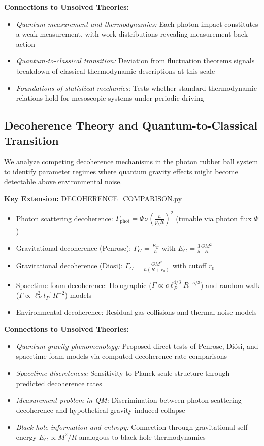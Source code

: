\documentclass[12pt,twoside]{article}
\begin{document}
\textbf{Connections to Unsolved Theories:}
\begin{itemize}
\item \textit{Quantum measurement and thermodynamics:} Each photon impact constitutes a weak measurement, with work distributions revealing measurement back-action
\item \textit{Quantum-to-classical transition:} Deviation from fluctuation theorems signals breakdown of classical thermodynamic descriptions at this scale
\item \textit{Foundations of statistical mechanics:} Tests whether standard thermodynamic relations hold for mesoscopic systems under periodic driving
\end{itemize}

\subsection{Decoherence Theory and Quantum-to-Classical Transition}
We analyze competing decoherence mechanisms in the photon rubber ball system to identify parameter regimes where quantum gravity effects might become detectable above environmental noise.

\textbf{Key Extension:} DECOHERENCE\_COMPARISON.py
\begin{itemize}
\item Photon scattering decoherence: $\Gamma_{\text{phot}} = \Phi \sigma \left(\frac{\hbar}{p_\lambda R}\right)^2$ (tunable via photon flux $\Phi$)
\item Gravitational decoherence (Penrose): $\Gamma_G = \frac{E_G}{\hbar}$ with $E_G = \frac{3}{5}\frac{GM^2}{R}$
\item Gravitational decoherence (Diosi): $\Gamma_G = \frac{G M^2}{\hbar(R + r_0)}$ with cutoff $r_0$
\item Spacetime foam decoherence: Holographic ($\Gamma \propto c \ell_P^{4/3} R^{-5/3}$) and random walk ($\Gamma \propto \ell_P^2 t_P^{-1} R^{-2}$) models
\item Environmental decoherence: Residual gas collisions and thermal noise models
\end{itemize}

\textbf{Connections to Unsolved Theories:}
\begin{itemize}
\item \textit{Quantum gravity phenomenology:} Proposed direct tests of Penrose, Diósi, and spacetime-foam models via computed decoherence-rate comparisons
\item \textit{Spacetime discreteness:} Sensitivity to Planck-scale structure through predicted decoherence rates
\item \textit{Measurement problem in QM:} Discrimination between photon scattering decoherence and hypothetical gravity-induced collapse
\item \textit{Black hole information and entropy:} Connection through gravitational self-energy $E_G \propto M^2/R$ analogous to black hole thermodynamics
\end{itemize}
\end{document}
